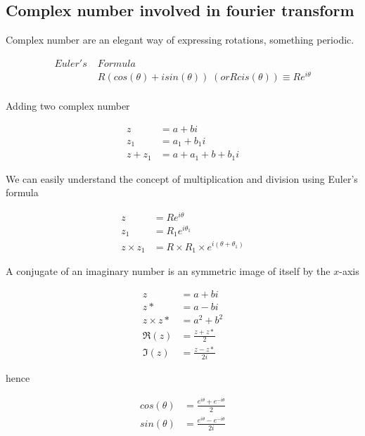 \documentclass{article}
\begin{document}
    \subsection{Complex number involved in fourier transform}

    Complex number are an elegant way of expressing rotations, something periodic.

    \begin{align}
        Euler's\;&Formula \nonumber\\
        &R(cos(\theta) + i sin(\theta)) \;(or Rcis(\theta)) \equiv Re^{i\theta}\\\nonumber
    \end{align}

    Adding two complex number

    \begin{align}
        z &= a + bi\\
        z_1 &= a_1 + b_1i\\
        z + z_1 &= a + a_1 + b + b_1i
    \end{align}

    We can easily understand the concept of multiplication and division using Euler's formula

    \begin{align}
        z &= R e^{i\theta}\\
        z_1 &= R_1 e^{i\theta_1}\\
        z \times z_1 &= R \times R_1 \times e^{i(\theta + \theta_1)}
    \end{align}

    A conjugate of an imaginary number is an symmetric image of itself by the $x$-axis

    \begin{align}
        z &= a + bi\\
        z* &= a - bi\\
        z \times z* &= a^2 + b^2\\
        \Re(z) &= \frac{z + z*}{2}\\
        \Im(z) &= \frac{z - z*}{2i}
    \end{align}

    hence 

    \begin{align}
        cos(\theta) &= \frac{e^{i\theta} + e^{-i\theta}}{2}\\
        sin(\theta) &= \frac{e^{i\theta} - e^{-i\theta}}{2i}\\\nonumber
    \end{align}
\end{document}
